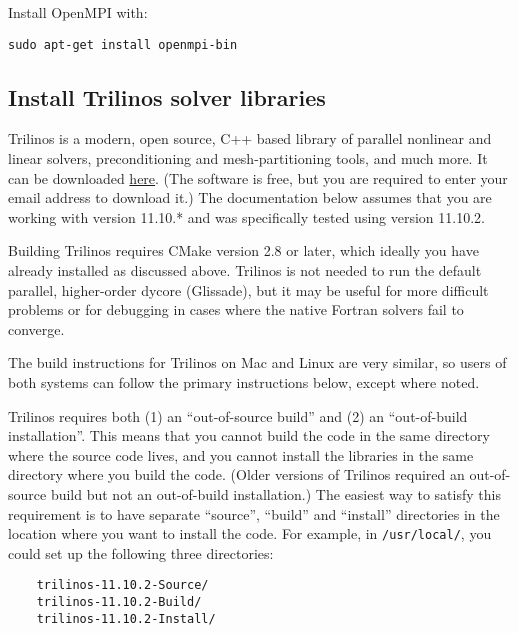 \begin{mdframed}[style=ubuntu] %
Install OpenMPI with:

\texttt{sudo apt-get install openmpi-bin}
\end{mdframed}                 %



\subsection{Install Trilinos solver libraries}

Trilinos is a modern, open source, C++ based library of parallel nonlinear and linear solvers, 
preconditioning and mesh-partitioning tools, and much more. It can be downloaded 
\href{trilinos.sandia.gov/download/}{here}.
(The software is free, but you are required to enter your email address to download it.) 
The documentation below assumes that you are working with version 11.10.* and was specifically 
tested using version 11.10.2. 

Building Trilinos requires CMake version 2.8 or later, which ideally you have already 
installed as discussed above. Trilinos is not needed to run the default 
parallel, higher-order dycore (Glissade), but it may be useful for  
more difficult problems or for debugging in cases where the native Fortran solvers 
fail to converge.

The build instructions for Trilinos on Mac and Linux are very similar, so users
of both systems can follow the primary instructions below, except where noted.

Trilinos requires both (1) an ``out-of-source build'' and (2) an ``out-of-build installation''. 
This means that you cannot build the code in the same directory where the source code lives, 
and you cannot install the libraries in the same directory where you build the code.
(Older versions of Trilinos required an out-of-source build but not an out-of-build installation.) 
The easiest way to satisfy this requirement is to have separate ``source'', ``build'' and 
``install'' directories in the location where you want to install the code. 
For example, in \texttt{/usr/local/}, you could set up the following three directories:

\begin{verbatim}
	trilinos-11.10.2-Source/
	trilinos-11.10.2-Build/
	trilinos-11.10.2-Install/
\end{verbatim}

